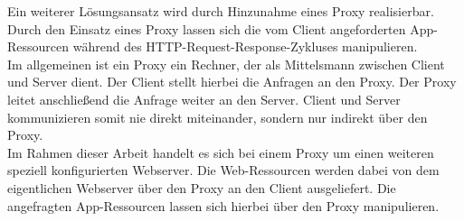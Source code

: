 \label{sec:sol_proxy}
Ein weiterer Lösungsansatz wird durch Hinzunahme eines Proxy realisierbar. Durch den Einsatz eines Proxy lassen sich die vom Client angeforderten App-Ressourcen während des HTTP-Request-Response-Zykluses manipulieren.\\
Im allgemeinen ist ein Proxy ein Rechner, der als Mittelsmann zwischen Client und Server dient. Der Client stellt hierbei die Anfragen an den Proxy. Der Proxy leitet anschließend die Anfrage weiter an den Server. Client und Server kommunizieren somit nie direkt miteinander, sondern nur indirekt über den Proxy.\\
Im Rahmen dieser Arbeit handelt es sich bei einem Proxy um einen weiteren speziell konfigurierten Webserver. Die Web-Ressourcen werden dabei von dem eigentlichen Webserver über den Proxy an den Client ausgeliefert. Die angefragten App-Ressourcen lassen sich hierbei über den Proxy manipulieren. 


